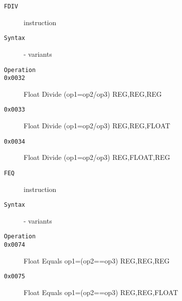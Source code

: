 \begin{description}
\item[\texttt{FDIV}] instruction\\
\item[\texttt{Syntax}] - variants\\

\item[\texttt{Operation}]
\item[\texttt{}]
\item[\texttt{0x0032}] Float Divide (op1=op2/op3)  {REG,REG,REG}       \\
\item[\texttt{0x0033}] Float Divide (op1=op2/op3)  {REG,REG,FLOAT}     \\
\item[\texttt{0x0034}] Float Divide (op1=op2/op3)  {REG,FLOAT,REG}     \\
\end{description}
\clearpage
\begin{description}
\item[\texttt{FEQ}] instruction\\
\item[\texttt{Syntax}] - variants\\

\item[\texttt{Operation}]
\item[\texttt{}]
\item[\texttt{0x0074}] Float Equals op1=(op2==op3)  {REG,REG,REG}       \\
\item[\texttt{0x0075}] Float Equals op1=(op2==op3)  {REG,REG,FLOAT}     \\
\end{description}
